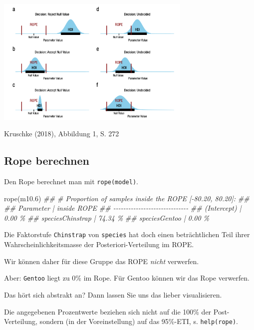 \documentclass[
  a4paper,
  DIV=11]{scrreprt}
\newenvironment{Shaded}{\begin{snugshade}}{\end{snugshade}}
\newcommand{\DocumentationTok}[1]{\textcolor[rgb]{0.37,0.37,0.37}{\textit{#1}}}
\newcommand{\FloatTok}[1]{\textcolor[rgb]{0.68,0.00,0.00}{#1}}
\newcommand{\FunctionTok}[1]{\textcolor[rgb]{0.28,0.35,0.67}{#1}}
\newcommand{\NormalTok}[1]{\textcolor[rgb]{0.00,0.23,0.31}{#1}}
\theoremstyle{definition}
\theoremstyle{remark}
\begin{document}
\includegraphics[width=0.7\textwidth,height=\textheight]{./img/Kruschke-2018-Fig1.png}

Kruschke (2018), Abbildung 1, S. 272

\hypertarget{rope-berechnen}{%
\subsection{Rope berechnen}\label{rope-berechnen}}

Den Rope berechnet man mit \texttt{rope(model)}.

\begin{Shaded}
\begin{Highlighting}[]
\FunctionTok{rope}\NormalTok{(m10}\FloatTok{.6}\NormalTok{)}
\DocumentationTok{\#\# \# Proportion of samples inside the ROPE [{-}80.20, 80.20]:}
\DocumentationTok{\#\# }
\DocumentationTok{\#\# Parameter        | inside ROPE}
\DocumentationTok{\#\# {-}{-}{-}{-}{-}{-}{-}{-}{-}{-}{-}{-}{-}{-}{-}{-}{-}{-}{-}{-}{-}{-}{-}{-}{-}{-}{-}{-}{-}{-}}
\DocumentationTok{\#\# (Intercept)      |      0.00 \%}
\DocumentationTok{\#\# speciesChinstrap |     74.34 \%}
\DocumentationTok{\#\# speciesGentoo    |      0.00 \%}
\end{Highlighting}
\end{Shaded}

Die Faktorstufe \texttt{Chinstrap} von \texttt{species} hat doch einen
beträchtlichen Teil ihrer Wahrscheinlichkeitsmasse der
Posteriori-Verteilung im ROPE.

Wir können daher für diese Gruppe das ROPE \emph{nicht} verwerfen.

Aber: \texttt{Gentoo} liegt zu 0\% im Rope. Für Gentoo können wir das
Rope verwerfen.

Das hört sich abstrakt an? Dann lassen Sie uns das lieber visualisieren.

\begin{tcolorbox}[enhanced jigsaw, leftrule=.75mm, toptitle=1mm, bottomtitle=1mm, titlerule=0mm, breakable, colframe=quarto-callout-note-color-frame, title=\textcolor{quarto-callout-note-color}{\faInfo}\hspace{0.5em}{Hinweis}, rightrule=.15mm, colback=white, arc=.35mm, left=2mm, bottomrule=.15mm, coltitle=black, opacitybacktitle=0.6, toprule=.15mm, colbacktitle=quarto-callout-note-color!10!white, opacityback=0]
Die angegebenen Prozentwerte beziehen sich nicht auf die 100\% der
Post-Verteilung, sondern (in der Voreinstellung) auf das 95\%-ETI, s.
\texttt{help(rope)}.
\end{tcolorbox}
\end{document}
